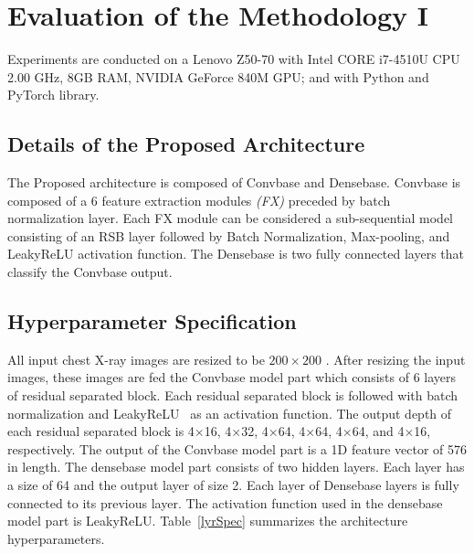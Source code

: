 \section{Evaluation of the Methodology I}

Experiments are conducted on a Lenovo Z50-70 with Intel CORE i7-4510U CPU 2.00 GHz, 8GB RAM, NVIDIA GeForce 840M GPU; and with Python and PyTorch library.

\subsection{Details of the Proposed Architecture}
The Proposed architecture is composed of Convbase and Densebase. Convbase is composed of a $6$ feature extraction modules \textit{(FX)} preceded by batch normalization layer. Each FX module can be considered a sub-sequential model consisting of an RSB layer followed by Batch Normalization, Max-pooling, and LeakyReLU activation function. The Densebase is two fully connected layers that classify the Convbase output.


\subsection{Hyperparameter Specification}
All input chest X-ray images are resized to be $200\times 200$ . After resizing the input images, these images are fed the Convbase model part which consists of 6 layers of residual separated block. Each residual separated block is followed with batch normalization and LeakyReLU~\cite{he2015delving} as an activation function. The output depth of each residual separated block is 4$\times$16, 4$\times$32, 4$\times$64, 4$\times$64, 4$\times$64, and 4$\times$16, respectively. The output of the Convbase model part is a 1D feature vector of 576 in length. The densebase model part consists of two hidden layers. Each layer has a size of 64 and the output layer of size 2. Each layer of Densebase layers is fully connected to its previous layer. The activation function used in the densebase model part is LeakyReLU. Table~\ref{lyrSpec} summarizes the architecture hyperparameters.

